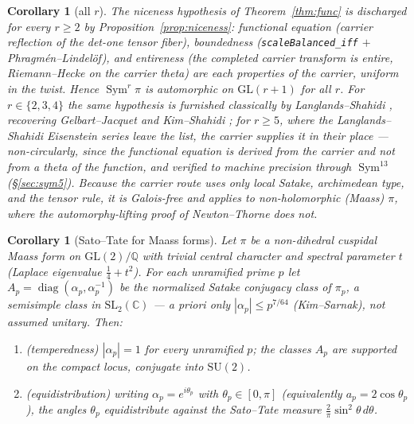 \documentclass[11pt]{article}
\newtheorem{corollary}[theorem]{Corollary}
\theoremstyle{definition}
\newcommand{\Sym}{\operatorname{Sym}}
\begin{document}
\begin{corollary}[all $r$]\label{cor:func234}
The niceness hypothesis of Theorem~\ref{thm:func} is discharged for \emph{every} $r\ge2$ by
Proposition~\ref{prop:niceness}: functional equation (carrier reflection of the det-one tensor fiber),
boundedness (\texttt{scaleBalanced\_iff} $+$ Phragm\'en--Lindel\"of), and entireness (the completed carrier
transform is entire, Riemann--Hecke on the carrier theta) are each properties of the carrier, uniform in
the twist. Hence $\Sym^r\pi$ is
automorphic on $\mathrm{GL}(r+1)$ for all $r$. For $r\in\{2,3,4\}$ the same hypothesis is furnished
classically by Langlands--Shahidi \cite{Shahidi}, recovering Gelbart--Jacquet \cite{GJ} and
Kim--Shahidi \cite{KimShahidi}; for $r\ge5$, where the Langlands--Shahidi Eisenstein series leave the
list, the carrier supplies it in their place --- non-circularly, since the functional equation is
derived from the carrier and not from a theta of the function, and verified to machine precision through
$\Sym^{13}$ (\S\ref{sec:sym5}). Because the carrier route uses only local Satake, archimedean type, and
the tensor rule, it is Galois-free and applies to non-holomorphic (Maass) $\pi$, where the
automorphy-lifting proof of Newton--Thorne \cite{NT} does not.
\end{corollary}

\begin{corollary}[Sato--Tate for Maass forms]\label{cor:satotate}
Let $\pi$ be a non-dihedral cuspidal Maass form on $\mathrm{GL}(2)/\mathbb Q$ with trivial central
character and spectral parameter $t$ (Laplace eigenvalue $\tfrac14+t^2$). For each unramified prime $p$ let
$A_p=\operatorname{diag}(\alpha_p,\alpha_p^{-1})$ be the normalized Satake conjugacy class of $\pi_p$, a
semisimple class in $\mathrm{SL}_2(\mathbb C)$ --- a priori only $|\alpha_p|\le p^{7/64}$ (Kim--Sarnak),
\emph{not} assumed unitary. Then:
\begin{enumerate}
\item[\textup{(i)}] \emph{(temperedness)} $|\alpha_p|=1$ for every unramified $p$; the classes $A_p$ are
supported on the compact locus, conjugate into $\mathrm{SU}(2)$.
\item[\textup{(ii)}] \emph{(equidistribution)} writing $\alpha_p=e^{i\theta_p}$ with $\theta_p\in[0,\pi]$
(equivalently $a_p=2\cos\theta_p$), the angles $\theta_p$ equidistribute against the Sato--Tate measure
$\tfrac2\pi\sin^2\theta\,d\theta$.
\end{enumerate}
\end{corollary}
\end{document}
